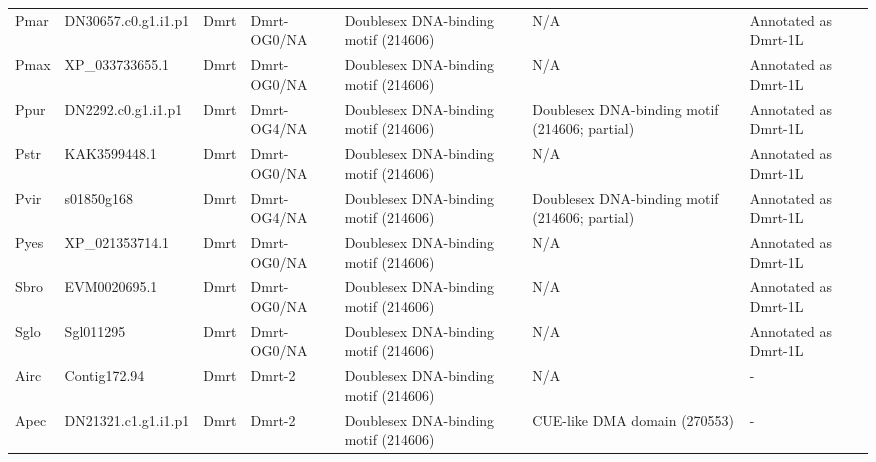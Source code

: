 \documentclass[../main.tex]{subfiles}
\begin{document}
\begin{landscape}
\begin{longtable}{lllllll}
		Pmar           & DN30657.c0.g1.i1.p1   & Dmrt           & Dmrt-OG0/NA         & Doublesex DNA-binding motif (214606)        & N/A                                                                    & Annotated as Dmrt-1L \\
		Pmax           & XP\_033733655.1       & Dmrt           & Dmrt-OG0/NA         & Doublesex DNA-binding motif (214606)        & N/A                                                                    & Annotated as Dmrt-1L \\
		Ppur           & DN2292.c0.g1.i1.p1    & Dmrt           & Dmrt-OG4/NA         & Doublesex DNA-binding motif (214606)        & Doublesex DNA-binding motif (214606; partial)                          & Annotated as Dmrt-1L \\
		Pstr           & KAK3599448.1          & Dmrt           & Dmrt-OG0/NA         & Doublesex DNA-binding motif (214606)        & N/A                                                                    & Annotated as Dmrt-1L \\
		Pvir           & s01850g168            & Dmrt           & Dmrt-OG4/NA         & Doublesex DNA-binding motif (214606)        & Doublesex DNA-binding motif (214606; partial)                          & Annotated as Dmrt-1L \\
		Pyes           & XP\_021353714.1       & Dmrt           & Dmrt-OG0/NA         & Doublesex DNA-binding motif (214606)        & N/A                                                                    & Annotated as Dmrt-1L \\
		Sbro           & EVM0020695.1          & Dmrt           & Dmrt-OG0/NA         & Doublesex DNA-binding motif (214606)        & N/A                                                                    & Annotated as Dmrt-1L \\
		Sglo           & Sgl011295             & Dmrt           & Dmrt-OG0/NA         & Doublesex DNA-binding motif (214606)        & N/A                                                                    & Annotated as Dmrt-1L \\
		Airc           & Contig172.94          & Dmrt           & Dmrt-2              & Doublesex DNA-binding motif (214606)        & N/A                                                                    & -                    \\
		Apec           & DN21321.c1.g1.i1.p1   & Dmrt           & Dmrt-2              & Doublesex DNA-binding motif (214606)        & CUE-like DMA domain (270553)                                           & -                    \\

\end{longtable}
\end{landscape}
\end{document}
